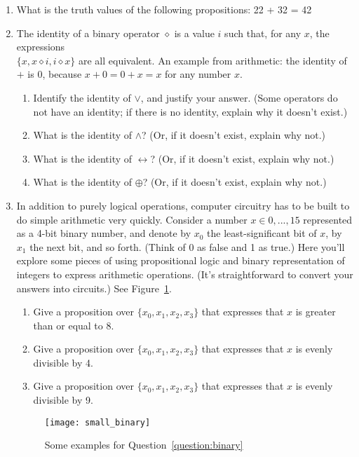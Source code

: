 \documentclass[11pt, oneside]{article}   	%
\begin{document}
\begin{enumerate}
\item What is the truth values of the following propositions: 22 + 32 = 42
\item The identity of a binary operator $\diamond$ is a value $i$ such that, for any $x$, the expressions \\$\{x,x\diamond i,i\diamond x\}$ are all equivalent.
An example from arithmetic: 
the identity of $+$ is $0$, because $x + 0 = 0 + x = x$ for any number $x$. 
\begin{enumerate}
\item Identify the identity of $\vee$, and justify your answer. (Some operators do not have an identity; if there is no identity, explain why it doesn’t exist.)
\item What is the identity of $\wedge$? (Or, if it doesn’t exist, explain why not.)
\item What is the identity of $\leftrightarrow$? (Or, if it doesn’t exist, explain why not.)
\item What is the identity of $\oplus$? (Or, if it doesn’t exist, explain why not.)
\end{enumerate}
\item \label{question:binary}
In addition to purely logical operations, computer circuitry has to be built to do simple arithmetic very quickly. 
Consider a number $x \in {0, . . . , 15}$ represented as a 4-bit binary number, 
and denote by $x_0$ the least-significant bit of $x$, by $x_1$ the next bit, and so forth. 
(Think of 0 as false and 1 as true.) 
Here you’ll explore some pieces of using propositional logic and binary representation of integers to express arithmetic operations. 
(It’s straightforward to convert your answers into circuits.) 
See Figure~\ref{fig:binary}.
\begin{enumerate}
\item Give a proposition over $\{x_0 , x_1 , x_2 , x_3 \}$ that expresses that $x$ is greater than or equal to 8.
\item Give a proposition over $\{x_0 , x_1 , x_2 , x_3 \}$ that expresses that $x$ is evenly divisible by 4.
\item Give a proposition over $\{x_0 , x_1 , x_2 , x_3 \}$ that expresses that $x$ is evenly divisible by 9.
\end{enumerate}
\begin{figure}
\centering
\texttt{[image: small\_binary]}
\caption{Some examples for Question~\ref{question:binary}}
\label{fig:binary}
\end{figure}

\end{enumerate}
\end{document}
